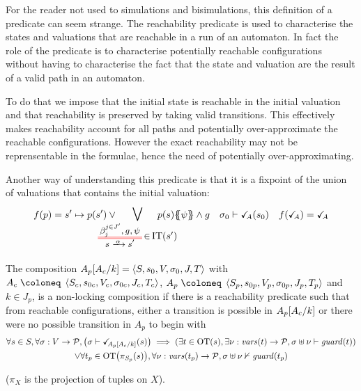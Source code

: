 \documentclass{article}
\begin{document}
For the reader not used to simulations and bisimulations, this definition of a predicate can seem strange.
The reachability predicate is used to characterise the states and valuations that are reachable in a run of an automaton.
In fact the role of the predicate is to characterise potentially reachable configurations without having to characterise the fact that the state and valuation are the result of a valid path in an automaton.

To do that we impose that the initial state is reachable in the initial valuation and that reachability is preserved by taking valid transitions.
This effectively makes reachability account for all paths and potentially over-approximate the reachable configurations.
However the exact reachability may not be reprensentable in the formulae, hence the need of potentially over-approximating.

Another way of understanding this predicate is that it is a fixpoint of the union of valuations that contains the initial valuation:
\begin{align*}
	f\mpar{p} = s' \mapsto p\mpar{s'} \vee \bigsymb{\bigvee_\subbox{\OTg \,\in\, \fIT{s'}}} p\mpar{s}\psubst{\psi} \wedge g &&
	\sigma_0 \vdash \reach{A}\mpar{s_0} &&
	f\mpar{\reach{A}} = \reach{A}
\end{align*}

\begin{defi}

The composition  \(A_p{\left[A_c\middle/k\right]} = \left<S,s_0,V,\sigma_0,J,T\right>\) with \(A_c \defobject \OA{S_c}{s_{0c}}{V_c}{\sigma_{0c}}{J_c}{T_c}\), \(A_p \defobject \OA{S_p}{s_{0p}}{V_p}{\sigma_{0p}}{J_p}{T_p}\) and \(k \in J_p\), is a non-locking composition if there is a reachability predicate such that from reachable configurations, either a transition is possible in \(A_p{\left[A_c\middle/k\right]}\) or there were no possible transition in \(A_p\) to begin with
\begin{multline*}
	\forall s \in S, \forall \sigma: V \to \mathcal{P}, {\left(\sigma \vdash \checkmark_{\!\! A_p{\left[A_c\middle/k\right]}}{\left(s\right)}\right)} \implies {\left(\exists t \in \mathrm{OT}{\left(s\right)}, \exists \nu: \mathit{vars}{\left(t\right)} \to \mathcal{P}, \sigma \uplus \nu \vdash \mathit{guard}{\left(t\right)}\right)} \\
	\vee \forall t_p \in \mathrm{OT}{\left(\pi_{S_p}{\left(s\right)}\right)}, \forall \nu: \mathit{vars}{\left(t_p\right)} \to \mathcal{P}, \sigma \uplus \nu \nvdash \mathit{guard}{\left(t_p\right)}
\end{multline*}
\end{defi}
(\(\pi_X\) is the projection of tuples on \(X\)).
\end{document}
